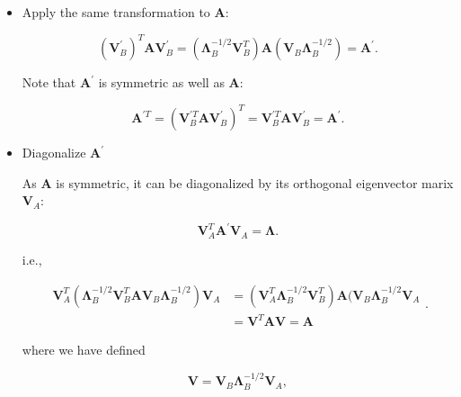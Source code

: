 \documentclass[10pt,b5paper,titlepage]{book}
\begin{document}
\begin{itemize}
    \item Apply the same transformation to $\mathbf{A}$:

        \begin{equation}
            (\mathbf{V}_{B}^{'})^{T}\mathbf{A}\mathbf{V}_{B}^{'}
            =(\mathbf{\Lambda}_{B}^{-1 / 2}\mathbf{V}_{B}^{T})
            \mathbf{A}(\mathbf{V}_{B}\mathbf{\Lambda}_{B}^{-1 / 2})
            =\mathbf{A}^{'}
        .\end{equation}

        Note that $\mathbf{A}^{'}$ is symmetric as well as $\mathbf{A}$:

        \begin{equation}
            \mathbf{A}^{'T}=(\mathbf{V}_{B}^{'T}\mathbf{A}\mathbf{V}_{B}^{'})^{T}
            =\mathbf{V}_{B}^{'T}\mathbf{A}\mathbf{V}_{B}^{'}=\mathbf{A}^{'}
        .\end{equation}

    \item Diagonalize $\mathbf{A}^{'}$

        As $\mathbf{A}$ is symmetric, it can be diagonalized by its orthogonal
        eigenvector marix $\mathbf{V}_{A}$:

        \begin{equation}
            \mathbf{V}_{A}^{T}\mathbf{A}^{'}\mathbf{V}_{A}=\mathbf{\Lambda}
        .\end{equation}

        i.e.,

        \begin{equation}
            \begin{array}{ll}
                \mathbf{V}_{A}^{T}(\mathbf{\Lambda}_{B}^{-1 / 2}\mathbf{V}_{B}^{T}
                \mathbf{A}\mathbf{V}_{B}\mathbf{\Lambda}_{B}^{-1 / 2})\mathbf{V}_{A}
                &= (\mathbf{V}_{A}^{T}\mathbf{\Lambda}_{B}^{-1 / 2}\mathbf{V}_{B}^{T})
                \mathbf{A}(\mathbf{V}_{B}\mathbf{\Lambda}_{B}^{-1 / 2}\mathbf{V}_{A}\\
                &= \mathbf{V}^{T}\mathbf{A}\mathbf{V}=\mathbf{A}
            \end{array}
        .\end{equation}


        where we have defined

        \begin{equation}
            \mathbf{V}= \mathbf{V}_{B}\mathbf{\Lambda}_{B}^{-1 / 2}\mathbf{V}_{A} 
        ,\end{equation}


\end{itemize}
\end{document}
